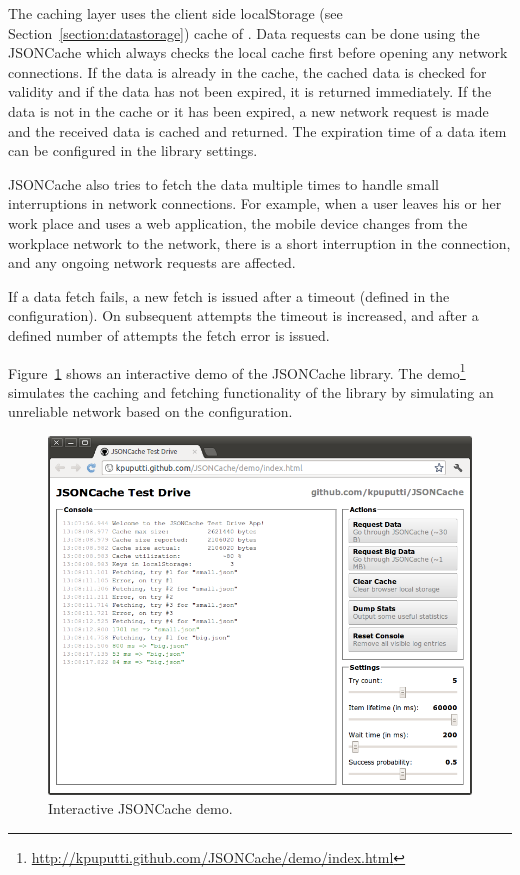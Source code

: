 The caching layer uses the client side localStorage (see
Section~\ref{section:datastorage}) cache of . Data
requests can be done using the JSONCache  which always
checks the local cache first before opening any network
connections. If the data is already in the cache, the cached data is
checked for validity and if the data has not been expired, it is
returned immediately. If the data is not in the cache or it has been
expired, a new network request is made and the received data is cached
and returned. The expiration time of a data item can be configured in
the library settings.

JSONCache also tries to fetch the data multiple times to handle small
interruptions in network connections.  For example, when a user leaves
his or her work place and uses a web application, the mobile device
changes from the workplace  network to the 
network, there is a short interruption in the connection, and any
ongoing network requests are affected.

If a data fetch fails, a new fetch is issued after a timeout (defined
in the configuration). On subsequent attempts the timeout is
increased, and after a defined number of attempts the fetch error is
issued.

Figure~\ref{figure:jsoncache-demo.png} shows an interactive demo of
the JSONCache library. The
demo\footnote{\url{http://kpuputti.github.com/JSONCache/demo/index.html}}
simulates the caching and fetching functionality of the library by
simulating an unreliable network based on the configuration.

\begin{figure}[ht]
  \begin{center}
    \includegraphics[width=\textwidth]{images/jsoncache-demo.png}
    \caption{Interactive JSONCache demo.}
    \label{figure:jsoncache-demo.png}
  \end{center}
\end{figure}
